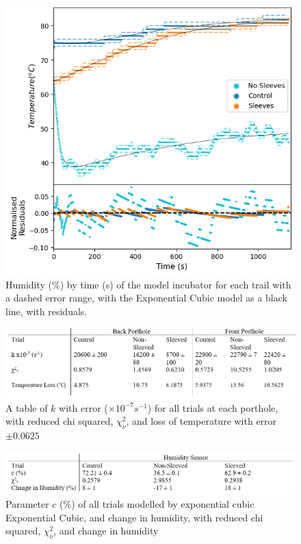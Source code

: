 \documentclass{article}
\begin{document}
\begin{figure}[h]
    \centering
    \captionsetup{justification=centering,margin=0.3cm}
    \includegraphics[scale = 0.3]{Hum.png}
    \caption{Humidity ($\%$) by time (s) of the model incubator for each trail with a dashed error range, with the Exponential Cubic model as a black line, with residuals.}
    \label{fig:ModHumPlot}
\end{figure}


\begin{figure}[h]
    \centering{}
    \captionsetup{justification=centering,margin=0.3cm}
    \includegraphics[scale = 0.5]{ModTmpTable.png}
    \caption{A table of $k$ with error ($\times10^{-7}s^{-1}$) for all trials at each porthole, with reduced chi squared, $\chi^2_\nu$, and loss of temperature with error $\pm0.0625$}
    \label{fig:ModTmpTable}
\end{figure}

\begin{figure}[!h]
    \centering{}
    \captionsetup{justification=centering,margin=0.3cm}
    \includegraphics[width = 0.9\linewidth]{ModHumTable.png}
    \caption{Parameter $c$ ($\%$) of all trials modelled by exponential cubic Exponential Cubic, and change in humidity, with reduced chi squared, $\chi^2_\nu$, and change in humidity }
    \label{fig:ModHumTable}
\end{figure}
\end{document}
